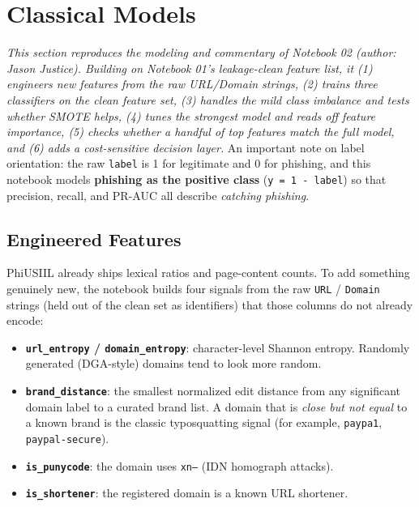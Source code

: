 \documentclass[stu,12pt,floatsintext]{apa7}
\newcommand{\code}[1]{\texttt{#1}}
\begin{document}
\section{Classical Models}

\emph{This section reproduces the modeling and commentary of Notebook 02
(author: Jason Justice). Building on Notebook 01's leakage-clean feature
list, it (1) engineers new features from the raw URL/Domain strings, (2)
trains three classifiers on the clean feature set, (3) handles the mild
class imbalance and tests whether SMOTE helps, (4) tunes the strongest
model and reads off feature importance, (5) checks whether a handful of
top features match the full model, and (6) adds a cost-sensitive decision
layer.} An important note on label orientation: the raw \code{label} is 1
for legitimate and 0 for phishing, and this notebook models \textbf{phishing
as the positive class} (\code{y = 1 - label}) so that precision, recall,
and PR-AUC all describe \emph{catching phishing}.

\subsection{Engineered Features}

PhiUSIIL already ships lexical ratios and page-content counts. To add
something genuinely new, the notebook builds four signals from the raw
\code{URL} / \code{Domain} strings (held out of the clean set as
identifiers) that those columns do not already encode:

\begin{itemize}
  \item \textbf{\code{url\_entropy} / \code{domain\_entropy}}:
    character-level Shannon entropy. Randomly generated (DGA-style)
    domains tend to look more random.
  \item \textbf{\code{brand\_distance}}: the smallest normalized edit
    distance from any significant domain label to a curated brand list. A
    domain that is \emph{close but not equal} to a known brand is the
    classic typosquatting signal (for example, \code{paypa1},
    \code{paypal-secure}).
  \item \textbf{\code{is\_punycode}}: the domain uses \code{xn--} (IDN
    homograph attacks).
  \item \textbf{\code{is\_shortener}}: the registered domain is a known URL
    shortener.
\end{itemize}
\end{document}
